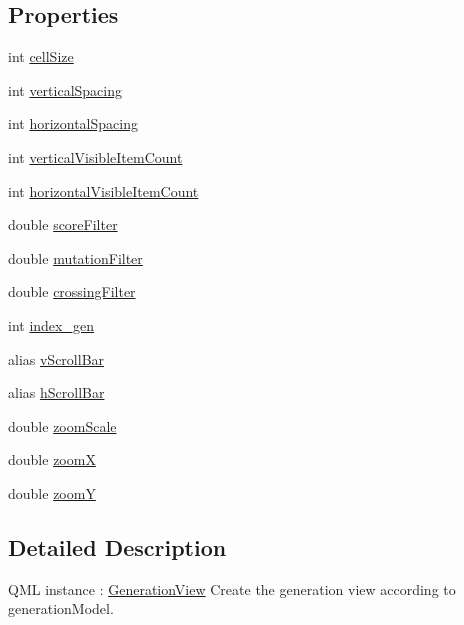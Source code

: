 \subsection*{Properties}
\begin{DoxyCompactItemize}
\item 
int \hyperlink{class_generation_view_ae5ec9b4364f5b05bae157b80448fdc99}{cell\+Size}
\item 
int \hyperlink{class_generation_view_a0a2f5b2a478378c507c7dcbb5b2b7fa2}{vertical\+Spacing}
\item 
int \hyperlink{class_generation_view_a07e1e99c5e0fd85ced01ced765ae051d}{horizontal\+Spacing}
\item 
int \hyperlink{class_generation_view_a2e6dbbc3c82e1a94e9722ec5f63551d9}{vertical\+Visible\+Item\+Count}
\item 
int \hyperlink{class_generation_view_ae21948d40b492b27833b2cff15ec8258}{horizontal\+Visible\+Item\+Count}
\item 
double \hyperlink{class_generation_view_a0f32b1eefc554bc0ed714ac61b81bf72}{score\+Filter}
\item 
double \hyperlink{class_generation_view_ae45158649855a4d52e6b352211a77d6e}{mutation\+Filter}
\item 
double \hyperlink{class_generation_view_a8b94ef0433f5cc2fb0ffd6e0aa6b0c4a}{crossing\+Filter}
\item 
int \hyperlink{class_generation_view_a3bd946690336b8ff4404751dc1e7b41d}{index\+\_\+gen}
\item 
alias \hyperlink{class_generation_view_a5732e342545688643c432cdb9240b243}{v\+Scroll\+Bar}
\item 
alias \hyperlink{class_generation_view_ab409dade06a659dec9865ceea71ce911}{h\+Scroll\+Bar}
\item 
double \hyperlink{class_generation_view_ad57ffa675b53681b9671f7a61286d426}{zoom\+Scale}
\item 
double \hyperlink{class_generation_view_a3d67ca1114e1b862aed9cf857bb7aa10}{zoomX}
\item 
double \hyperlink{class_generation_view_aadd82b9a0aa525d054082aaa4c04c4a9}{zoomY}
\end{DoxyCompactItemize}


\subsection{Detailed Description}
Q\+ML instance \+: \hyperlink{class_generation_view}{Generation\+View} Create the generation view according to generation\+Model. 

